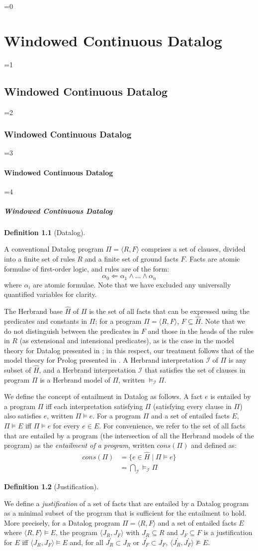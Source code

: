 \documentclass[twocolumn,preprint,3p,number]{elsarticle}
\theoremstyle{plain}
\theoremstyle{definition}
\newtheorem{definition}{Definition}
\newcounter{nestingdepth}
\newenvironment{nestedsection}[2]{
  \ifnum\value{nestingdepth}=0
    \chapter{#1}
  \else
    \ifnum\value{nestingdepth}=1
      \section{#1}
    \else
      \ifnum\value{nestingdepth}=2
        \subsection{#1}
      \else
        \ifnum\value{nestingdepth}=3
          \subsubsection{#1}
        \else
          \ifnum\value{nestingdepth}=4
            \paragraph{#1}
          \else
            \PackageError{nestedsections}{Maximum nesting level exceeded!}{uh oh!}
          \fi
        \fi
      \fi
    \fi
  \fi
  \addtocounter{nestingdepth}{1}
  \label{sec:#2}
}{\addtocounter{nestingdepth}{-1}}
\def\labeldef#1{\label{def:#1}}
\begin{document}
\begin{nestedsection}{Windowed Continuous Datalog}{semantics}
\begin{definition}[Datalog]
\labeldef{continuous datalog: datalog program}

A conventional Datalog program $\Pi = \langle R, F\rangle$ comprises a
set of clauses, divided into a finite set of rules $R$ and a finite
set of ground facts $F$. Facts are atomic formulae of first-order logic, and
rules are of the form:
\[ \alpha_0 \Leftarrow \alpha_1 \land \ldots \land \alpha_n \]
where $\alpha_i$ are atomic formulae. Note that we have excluded any
universally quantified variables for clarity.

The Herbrand base $\hat{H}$ of $\Pi$ is the set of all facts that can
be expressed using the predicates and constants in $\Pi$; for a program $\Pi =
\langle R, F \rangle$, $F \subseteq \hat{H}$. Note that we do not
distinguish between the predicates in $F$ and those in the heads of
the rules in $R$ (as extensional and intensional predicates), as is
the case in the model theory for Datalog presented in
\cite{datalog-basics}; in this respect, our treatment follows that of
the model theory for Prolog presented in \cite{prolog-semantics}. A
Herbrand interpretation $\mathcal{I}$ of $\Pi$ is any subset of
$\hat{H}$, and a Herbrand interpretation $\mathcal{I}$ that satisfies
the set of clauses in program $\Pi$ is a Herbrand model of $\Pi$,
written $\models_{\mathcal{I}} \Pi$.

We define the concept of entailment in Datalog as follows. A fact $e$
is entailed by a program $\Pi$ iff each interpretation satisfying
$\Pi$ (satisfying every clause in $\Pi$) also satisfies $e$, written
$\Pi \models e$. For a program $\Pi$ and a set of entailed facts
$E$, $\Pi \models E$ iff $\Pi \models e$ for every $e \in E$. For
convenience, we refer to the set of all facts that are entailed by a
program (the intersection of all the Herbrand models of the program)
as the {\em entailment of a program}, written $cons(\Pi)$ and defined
as:
\begin{align*}
  cons(\Pi) &= \{ e \in \hat{H} \mid \Pi \models e \} \\
  &= \bigcap_\mathcal{I} \models_\mathcal{I} \Pi
\end{align*}
\end{definition}

\begin{definition}[Justification]
\labeldef{continuous datalog: justification}

We define a {\em justification} of a set of facts that are entailed by
a Datalog program as a minimal subset of the program that is
sufficient for the entailment to hold. More precisely, for a Datalog
program $\Pi = \langle R, F \rangle$ and a set of entailed facts $E$
where $\langle R, F \rangle \models E$, the program $\langle J_R, J_F
\rangle$ with ${J_R \subseteq R}$ and ${J_F \subseteq F}$ is a
justification for $E$ iff $\langle J_R, J_F \rangle \models E$ and,
for all ${J^\prime_R \subset J_R}$ or ${J^\prime_F \subset J_F}$, ${\langle J^\prime_R, J^\prime_F
\rangle \not\models E}$.


\end{definition}
\end{nestedsection}
\end{document}
